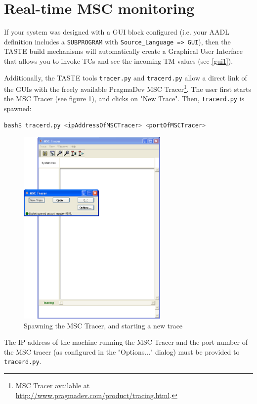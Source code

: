 \documentclass[11pt]{book}
\begin{document}
   \section{Real-time MSC monitoring}
If your system was designed with a GUI block configured (i.e. your AADL definition includes a \texttt{SUBPROGRAM}
with \texttt{Source\_Language => GUI}), then the TASTE build mechanisms will automatically create a Graphical
User Interface that allows you to invoke TCs and see the incoming TM values (see \ref{gui1}). 

Additionally, the TASTE tools \texttt{tracer.py} and \texttt{tracerd.py} allow a direct link of the GUIs with
the freely available PragmaDev MSC Tracer\footnote{MSC Tracer available at \url{http://www.pragmadev.com/product/tracing.html}.}.
The user first starts the MSC Tracer (see figure \ref{msc1}), and clicks on "New Trace". Then, \texttt{tracerd.py} is spawned:

      \begin{lstlisting}[language=bash]
bash$ tracerd.py <ipAddressOfMSCTracer> <portOfMSCTracer>
      \end{lstlisting}

\begin{figure}
\centering
\includegraphics[width=0.65\textwidth]{imgs/msc1}
\caption{Spawning the MSC Tracer, and starting a new trace}
\label{msc1}
\end{figure}

The IP address of the machine running the MSC Tracer and the port number of the MSC tracer (as configured in the "Options..." dialog)
must be provided to \texttt{tracerd.py}.
\end{document}
